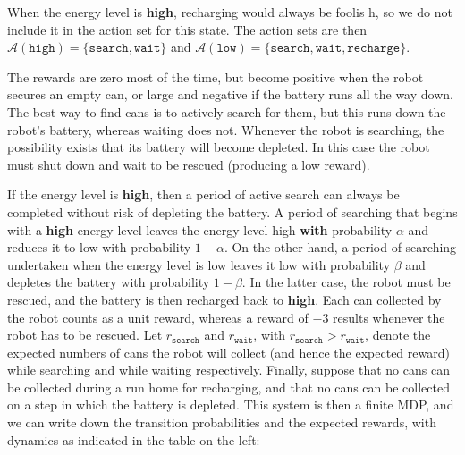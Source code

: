 \documentclass[
  letterpaper,
  DIV=11,
  numbers=noendperiod]{scrreprt}
\theoremstyle{definition}
\theoremstyle{remark}
\begin{document}
When the energy level is \textbf{high}, recharging would always be
foolis h, so we do not include it in the action set for this state. The
action sets are then
\(\mathcal{A}(\texttt{high}) = \{\texttt{search}, \texttt{wait}\}\) and
\(\mathcal{A}(\texttt{low}) = \{\texttt{search}, \texttt{wait}, \texttt{recharge}\}\).

The rewards are zero most of the time, but become positive when the
robot secures an empty can, or large and negative if the battery runs
all the way down. The best way to find cans is to actively search for
them, but this runs down the robot's battery, whereas waiting does not.
Whenever the robot is searching, the possibility exists that its battery
will become depleted. In this case the robot must shut down and wait to
be rescued (producing a low reward).

If the energy level is \textbf{high}, then a period of active search can
always be completed without risk of depleting the battery. A period of
searching that begins with a \textbf{high} energy level leaves the
energy level high \textbf{with} probability \(\alpha\) and reduces it to
low with probability \(1 - \alpha\). On the other hand, a period of
searching undertaken when the energy level is low leaves it low with
probability \(\beta\) and depletes the battery with probability
\(1 - \beta\). In the latter case, the robot must be rescued, and the
battery is then recharged back to \textbf{high}. Each can collected by
the robot counts as a unit reward, whereas a reward of \(-3\) results
whenever the robot has to be rescued. Let \(r_{\texttt{search}}\) and
\(r_{\texttt{wait}}\), with \(r_{\texttt{search}} > r_{\texttt{wait}}\),
denote the expected numbers of cans the robot will collect (and hence
the expected reward) while searching and while waiting respectively.
Finally, suppose that no cans can be collected during a run home for
recharging, and that no cans can be collected on a step in which the
battery is depleted. This system is then a finite MDP, and we can write
down the transition probabilities and the expected rewards, with
dynamics as indicated in the table on the left:
\end{document}
